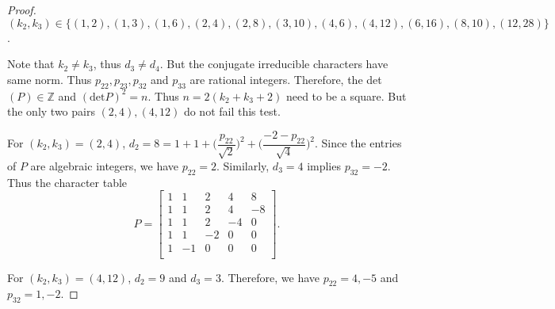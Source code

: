 \documentclass[12pt]{amsart}
\begin{document}
\begin{proof}
$(k_2,k_3)\in \{(1, 2),
(1, 3),
(1, 6),
(2, 4),
(2, 8),
(3, 10),
(4, 6),
(4, 12),
(6, 16),
(8, 10),
(12, 28)\}
$.

Note that $k_2\neq k_3$, thus $d_3\neq d_4$. But the  conjugate irreducible characters have same norm. Thus $p_{22},  p_{23}, p_{32}$ and $p_{33}$
are rational integers. Therefore, the det$(P) \in{{\mathbb Z}}$ and $(\mbox{det}P)^2=n$. Thus $n=2(k_2+k_3+2)$ need to be a square. But the only two pairs $(2, 4),
(4, 12)$ do not fail this test.

For $(k_2,k_3)=(2, 4)$, $d_2=8=1+1+\big(\dfrac{p_{22}}{\sqrt2}\big)^2+\big(\dfrac{-2-p_{22}}{\sqrt4}\big)^2$. Since the entries of $P$ are algebraic integers, we have $p_{22}=2$.
Similarly, $d_3=4$ implies $p_{32}=-2$.
Thus the character table
$$P=\left[
   \begin{array}{ccccc}
     1 & 1 & 2 &4&8\\
     1 & 1 &   2 & 4&-8\\
      1 &  1 & 2&  -4& 0\\
     1 & 1 &  -2&  0& 0\\
     1 &  -1 &  0&  0& 0\\
\end{array}\right].$$

For $(k_2,k_3)=(4, 12)$, $d_2=9$ and  $d_3=3$. Therefore, we have  $p_{22}=4,-5$ and  $p_{32}=1, -2$.

\smallskip


\end{proof}
\end{document}
